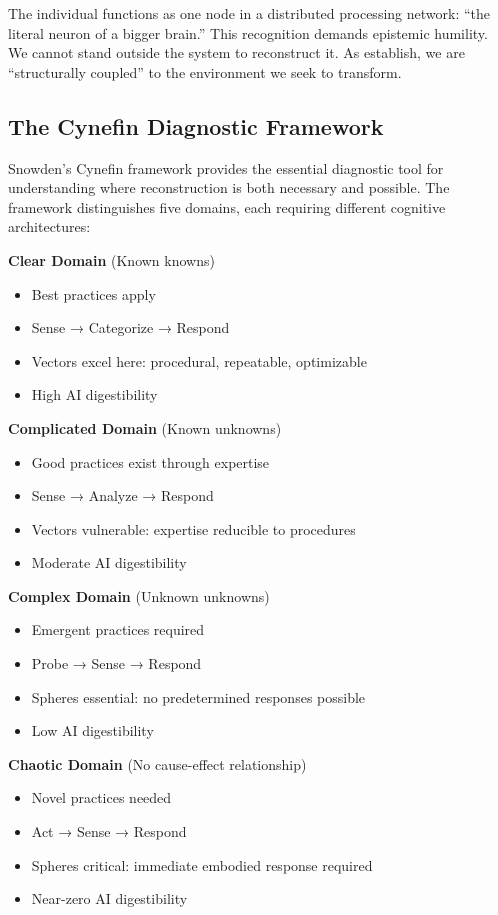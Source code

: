 The individual functions as one node in a distributed processing network: ``the literal neuron of a bigger brain.'' This recognition demands epistemic humility. We cannot stand outside the system to reconstruct it. As \citet{maturana1987} establish, we are ``structurally coupled'' to the environment we seek to transform.

\subsection{The Cynefin Diagnostic Framework}

Snowden's Cynefin framework \citep{snowden2007} provides the essential diagnostic tool for understanding where reconstruction is both necessary and possible. The framework distinguishes five domains, each requiring different cognitive architectures:

\textbf{Clear Domain} (Known knowns)
\begin{itemize}
\item Best practices apply
\item Sense → Categorize → Respond
\item Vectors excel here: procedural, repeatable, optimizable
\item High AI digestibility
\end{itemize}

\textbf{Complicated Domain} (Known unknowns)
\begin{itemize}
\item Good practices exist through expertise
\item Sense → Analyze → Respond
\item Vectors vulnerable: expertise reducible to procedures
\item Moderate AI digestibility
\end{itemize}

\textbf{Complex Domain} (Unknown unknowns)
\begin{itemize}
\item Emergent practices required
\item Probe → Sense → Respond
\item Spheres essential: no predetermined responses possible
\item Low AI digestibility
\end{itemize}

\textbf{Chaotic Domain} (No cause-effect relationship)
\begin{itemize}
\item Novel practices needed
\item Act → Sense → Respond
\item Spheres critical: immediate embodied response required
\item Near-zero AI digestibility
\end{itemize}

